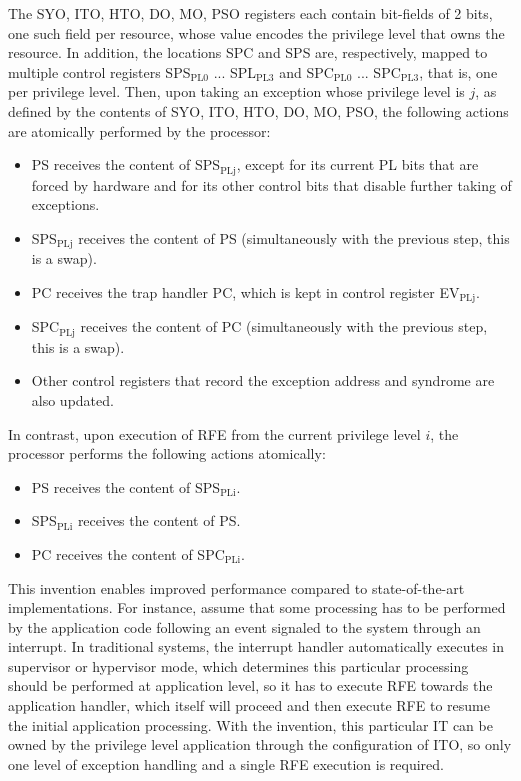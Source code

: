 The SYO, ITO, HTO, DO, MO, PSO registers each contain bit-fields of 2 bits, one such field per resource, whose value encodes the privilege level that owns the resource. In addition, the locations SPC and SPS are, respectively, mapped to multiple control registers SPS${}_\text{PL0}$ ... SPL${}_\text{PL3}$ and SPC${}_\text{PL0}$ ... SPC${}_\text{PL3}$, that is, one per privilege level. Then, upon taking an exception whose privilege level is $j$, as defined by the contents of SYO, ITO, HTO, DO, MO, PSO, the following actions are atomically performed by the processor:
\begin{itemize}
    \item PS receives the content of SPS${}_\text{PLj}$, except for its current PL bits that are forced by hardware and for its other control bits that disable further taking of exceptions.
    \item SPS${}_\text{PLj}$ receives the content of PS (simultaneously with the previous step, this is a swap).
    \item PC receives the trap handler PC, which is kept in control register EV${}_\text{PLj}$.
    \item SPC${}_\text{PLj}$ receives the content of PC (simultaneously with the previous step, this is a swap).
    \item Other control registers that record the exception address and syndrome are also updated.
\end{itemize}
In contrast, upon execution of RFE from the current privilege level $i$, the processor performs the following actions atomically:
\begin{itemize}
    \item PS receives the content of SPS${}_\text{PLi}$.
    \item SPS${}_\text{PLi}$ receives the content of PS.
    \item PC receives the content of SPC${}_\text{PLi}$.
\end{itemize}

This invention enables improved performance compared to state-of-the-art implementations. For instance, assume that some processing has to be performed by the application code following an event signaled to the system through an interrupt. In traditional systems, the interrupt handler automatically executes in supervisor or hypervisor mode, which determines this particular processing should be performed at application level, so it has to execute RFE towards the application handler, which itself will proceed and then execute RFE to resume the initial application processing. With the invention, this particular IT can be owned by the privilege level application through the configuration of ITO, so only one level of exception handling and a single RFE execution is required.

